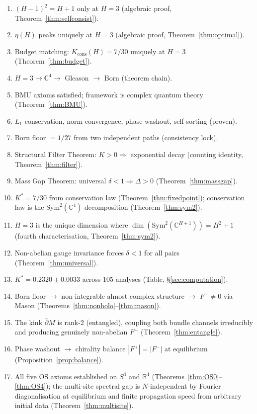 \documentclass[11pt,a4paper]{article}
\theoremstyle{definition}
\theoremstyle{remark}
\newcommand{\C}{\mathbb{C}}
\newcommand{\R}{\mathbb{R}}
\newcommand{\dbar}{\bar{\partial}}
\begin{document}
\begin{enumerate}[nosep]
\item $(H-1)^2=H+1$ only at $H=3$ (algebraic proof, Theorem~\ref{thm:selfconsist}).
\item $\eta(H)$ peaks uniquely at $H=3$ (algebraic proof, Theorem~\ref{thm:optimal}).
\item Budget matching: $K_{\mathrm{cons}}(H)=7/30$ uniquely at $H=3$ (Theorem~\ref{thm:budget}).
\item $H=3\to\C^4\to$ Gleason $\to$ Born (theorem chain).
\item BMU axioms satisfied; framework is complex quantum theory (Theorem~\ref{thm:BMU}).
\item $L_1$ conservation, norm convergence, phase washout, self-sorting (proven).
\item Born floor $=1/27$ from two independent paths (consistency lock).
\item Structural Filter Theorem: $K>0\Rightarrow$ exponential decay (counting identity, Theorem~\ref{thm:filter}).
\item Mass Gap Theorem: universal $\delta<1\Rightarrow\Delta>0$ (Theorem~\ref{thm:massgap}).
\item $K^*=7/30$ from conservation law (Theorem~\ref{thm:fixedpoint}); conservation law is the $\mathrm{Sym}^2(\C^4)$ decomposition (Theorem~\ref{thm:sym2}).
\item $H=3$ is the unique dimension where $\dim(\mathrm{Sym}^2(\C^{H+1}))=H^2+1$ (fourth characterisation, Theorem~\ref{thm:sym2}).
\item Non-abelian gauge invariance forces $\delta<1$ for all pairs (Theorem~\ref{thm:universal}).
\item $K^*=0.2320\pm 0.0033$ across 105 analyses (Table, \S\ref{sec:computation}).
\item Born floor $\to$ non-integrable almost complex structure $\to$ $F^+\neq 0$ via Mason (Theorems~\ref{thm:nonholo}--\ref{thm:mason}).
\item The kink $\dbar M$ is rank-2 (entangled), coupling both bundle channels irreducibly and producing genuinely non-abelian $F^+$ (Theorem~\ref{thm:entangle}).
\item Phase washout $\to$ chirality balance $|F^+|=|F^-|$ at equilibrium (Proposition~\ref{prop:balance}).
\item All five OS axioms established on $S^4$ and $\R^4$ (Theorems~\ref{thm:OS0}--\ref{thm:OS4}); the multi-site spectral gap is $N$-independent by Fourier diagonalisation at equilibrium and finite propagation speed from arbitrary initial data (Theorem~\ref{thm:multisite}).

\end{enumerate}
\end{document}
